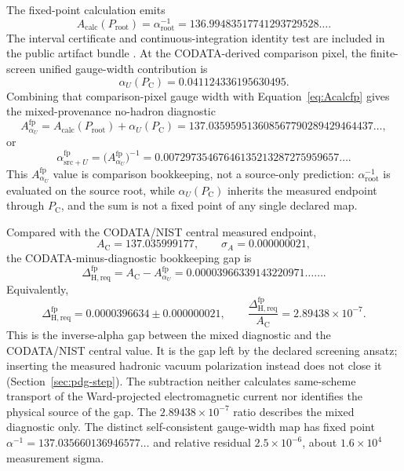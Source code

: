\documentclass[11pt]{article}
\theoremstyle{remark}
\newcommand{\alphainv}{\alpha^{-1}}
\newcommand{\Ppub}{P_{\mathrm C}}
\newcommand{\Dhadreq}{\Delta_{\mathrm{H,req}}}
\begin{document}
The fixed-point calculation emits
\begin{equation}
A_{\mathrm{calc}}(P_{\mathrm{root}})
=
\alphainv_{\mathrm{root}}
=
136.99483517741293729528\ldots.
\label{eq:Acalcfp}
\end{equation}
The interval certificate and continuous-integration identity test are included
in the public artifact bundle \cite{oph-code}.
At the CODATA-derived comparison pixel, the finite-screen unified gauge-width contribution is
\[
\alpha_U(\Ppub)=0.041124336195630495.
\]
Combining that comparison-pixel gauge width with Equation~\eqref{eq:Acalcfp}
gives the mixed-provenance
no-hadron diagnostic
\begin{equation}
A_{\alpha_U}^{\mathrm{fp}}
=A_{\mathrm{calc}}(P_{\mathrm{root}})+\alpha_U(\Ppub)
=137.035959513608567790289429464437\ldots,
\label{eq:barealphaUaddition}
\end{equation}
or
\begin{equation}
\alpha_{\mathrm{src}+U}^{\mathrm{fp}}
=\bigl(A_{\alpha_U}^{\mathrm{fp}}\bigr)^{-1}
=0.00729735467646135213287275959657\ldots.
\label{eq:barealphaUalpha}
\end{equation}
This \(A_{\alpha_U}^{\mathrm{fp}}\) value is comparison bookkeeping, not a source-only prediction:
\(\alpha_{\mathrm{root}}^{-1}\) is evaluated on the source root, while \(\alpha_U(\Ppub)\) inherits
the measured endpoint through \(\Ppub\), and the sum is not a fixed point of any single declared map.

Compared with the CODATA/NIST central measured endpoint,
\begin{equation}
A_{\mathrm C}=137.035999177,
\qquad
\sigma_A=0.000000021,
\end{equation}
the CODATA-minus-diagnostic bookkeeping gap is
\begin{equation}
\Dhadreq^{\mathrm{fp}}
=
A_{\mathrm C}-A_{\alpha_U}^{\mathrm{fp}}
=
0.00003966339143220971\ldots\ldots.
\label{eq:Dempfp}
\end{equation}
Equivalently,
\begin{equation}
\Dhadreq^{\mathrm{fp}}
=0.0000396634\pm0.000000021,
\qquad
\frac{\Dhadreq^{\mathrm{fp}}}{A_{\mathrm C}}
=2.89438\times10^{-7}.
\label{eq:Dhadrequncertainty}
\end{equation}
This is the inverse-alpha gap between the mixed diagnostic and the CODATA/NIST central value. It is
the gap left by the declared screening ansatz; inserting the measured hadronic vacuum
polarization instead does not close it (Section~\ref{sec:pdg-step}). The subtraction neither
calculates same-scheme transport of the Ward-projected electromagnetic current nor
identifies the physical source of the gap.
The \(2.89438\times10^{-7}\) ratio describes the mixed diagnostic only. The distinct
self-consistent gauge-width map has fixed point
\(\alpha^{-1}=137.035660136946577\ldots\) and relative residual
\(2.5\times10^{-6}\), about \(1.6\times10^{4}\) measurement sigma.
\end{document}
